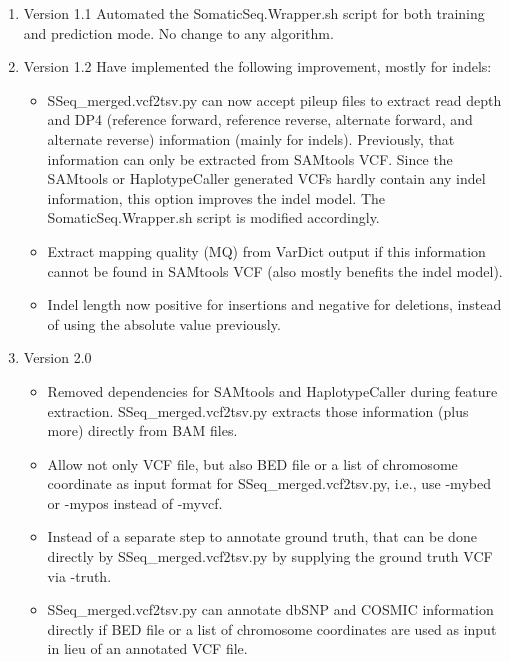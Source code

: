 \documentclass[10pt,letterpaper]{article}
\begin{document}
\begin{sloppypar}
\begin{enumerate}
    \item Version 1.1
    Automated the SomaticSeq.Wrapper.sh script for both training and prediction mode. No change to any algorithm. 

    \item Version 1.2
    Have implemented the following improvement, mostly for indels:

    \begin{itemize}

      \item 
      SSeq\_merged.vcf2tsv.py can now accept pileup files to extract read depth and DP4 (reference forward, reference reverse, alternate forward, and alternate reverse) information (mainly for indels). Previously, that information can only be extracted from SAMtools VCF. Since the SAMtools or HaplotypeCaller generated VCFs hardly contain any indel information, this option improves the indel model. The SomaticSeq.Wrapper.sh script is modified accordingly.
	    \item
	    Extract mapping quality (MQ) from VarDict output if this information cannot be found in SAMtools VCF (also mostly benefits the indel model). 
	   
	    \item
	    Indel length now positive for insertions and negative for deletions, instead of using the absolute value previously. 
	 
	\end{itemize}
	
	
	
	\item Version 2.0
	
		\begin{itemize}
		  \item
		  Removed dependencies for SAMtools and HaplotypeCaller during feature extraction. SSeq\_merged.vcf2tsv.py extracts those information (plus more) directly from BAM files.
		
		  \item
		  Allow not only VCF file, but also BED file or a list of chromosome coordinate as input format for SSeq\_merged.vcf2tsv.py, i.e., use -mybed or -mypos instead of -myvcf. 
		
		  \item
		  Instead of a separate step to annotate ground truth, that can be done directly by SSeq\_merged.vcf2tsv.py by supplying the ground truth VCF via -truth.
		
		  \item
		  SSeq\_merged.vcf2tsv.py can annotate dbSNP and COSMIC information directly if BED file or a list of chromosome coordinates are used as input in lieu of an annotated VCF file. 
		

\end{itemize}
\end{enumerate}
\end{sloppypar}
\end{document}

